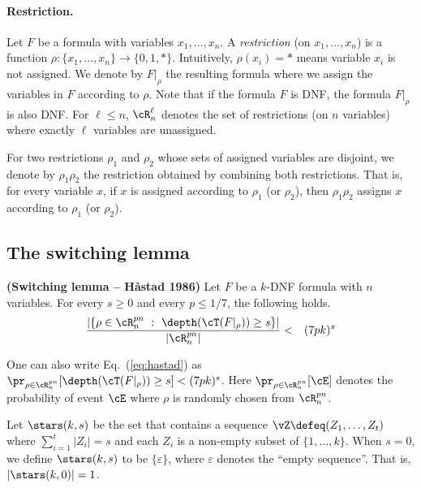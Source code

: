 \documentclass[11pt, a4paper]{article}
\begin{document}
\paragraph*{Restriction.}
Let $F$ be a formula with variables $x_1,\ldots,x_n$.
A {\em restriction} (on $x_1,\ldots,x_n$) is a function $\rho: \{x_1,\ldots,x_n\}\to\{0,1,*\}$.
Intuitively, $\rho(x_i)=*$ means variable $x_i$ is not assigned.
We denote by $F|_{\rho}$ the resulting formula where we assign the variables in $F$ according to $\rho$.
Note that if the formula $F$ is DNF,
the formula $F|_{\rho}$ is also DNF.
For $\ell \leq n$, $\cR^{\ell}_n$ denotes the set of restrictions (on $n$ variables)
where exactly $\ell$ variables are unassigned.


For two restrictions $\rho_1$ and $\rho_2$ whose sets of assigned variables are disjoint,
we denote by $\rho_1\rho_2$ the restriction obtained by combining both restrictions.
That is, for every variable $x$, if $x$ is assigned according to $\rho_1$ (or $\rho_2$),
then $\rho_1\rho_2$ assigns $x$ according to $\rho_1$ (or $\rho_2$).



\subsection{The switching lemma}


\begin{lemma}
\label{lem:switching-lemma}
{\bf (Switching lemma -- H\r{a}stad 1986)}
Let $F$ be a $k$-DNF formula with $n$ variables.
For every $s\geq 0$ and every $p \leq 1/7$, the following holds.
\begin{eqnarray}
\label{eq:hastad}
\frac{|\{\rho \in \cR^{pn}_n \ : \ \depth(\cT(F|_\rho))\geq s\}|}{|\cR^{pn}_n|}
& < & (7pk)^s
\end{eqnarray}
\end{lemma}

One can also write Eq.~(\ref{eq:hastad}) as $\pr_{\rho\in \cR^{pn}_n} [ \depth(\cT(F|_\rho))\geq s]  <  (7pk)^s$.
Here $\pr_{\rho\in \cR^{pn}_n}[\cE]$ denotes the probability of event $\cE$ where $\rho$ is randomly chosen from $\cR^{pn}_n$.

Let $\stars(k,s)$ be the set that contains a sequence $\vZ \defeq (Z_1,\ldots,Z_t)$
where $\sum_{i=1}^t |Z_i|=s$ and each $Z_i$ is a non-empty subset of $\{1,\ldots,k\}$.
When $s=0$, we define $\stars(k,s)$ to be $\{\varepsilon\}$,
where $\varepsilon$ denotes the ``empty sequence''.
That is, $|\stars(k,0)|=1$.
\end{document}
